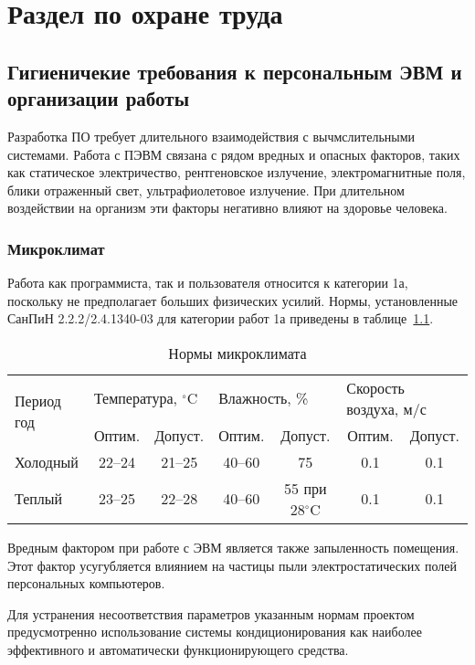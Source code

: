 \chapter{Раздел по охране труда}

\section{Гигиеничекие требования к персональным ЭВМ и организации работы}

Разработка ПО требует длительного взаимодействия с вычмслительными системами. Работа с ПЭВМ связана с рядом вредных и опасных факторов, таких как статическое электричество, рентгеновское излучение, электромагнитные поля, блики отраженный свет, ультрафиолетовое излучение. При длительном воздействии на организм эти факторы негативно влияют на здоровье человека.

\subsection{Микроклимат}

Работа как программиста, так и пользователя относится к категории 1а, поскольку не предполагает больших физических усилий. Нормы, установленные СанПиН 2.2.2/2.4.1340-03 для категории работ 1а приведены в таблице~\ref{tab:microclimate}.

\begin{table}[ht]
\caption{Нормы микроклимата}
\begin{tabular}{|l|c|c|c|c|c|c|}
\hline
\multirow{2}{*}{Период год} & \multicolumn{2}{l|}{Температура, $^\circ \mbox{C}$} & \multicolumn{2}{l|}{Влажность, \%} & \multicolumn{2}{l|}{Скорость воздуха, м/с} \\
\cline{2-7}
&Оптим.&Допуст.&Оптим.&Допуст.&Оптим.&Допуст.\\
\hline
Холодный &22--24&21--25&40--60&75&0.1&0.1\\
\hline
Теплый &23--25&22--28&40--60&55 при 28$^\circ \mbox{C}$&0.1&0.1\\
\hline 
\end{tabular}
\label{tab:microclimate}
\end{table}

Вредным фактором при работе с ЭВМ является также запыленность помещения. Этот фактор усугубляется влиянием на частицы пыли электростатических полей персональных компьютеров.

Для устранения несоответствия параметров указанным нормам проектом предусмотренно использование системы кондиционирования как наиболее эффективного и автоматически функционирующего средства.


